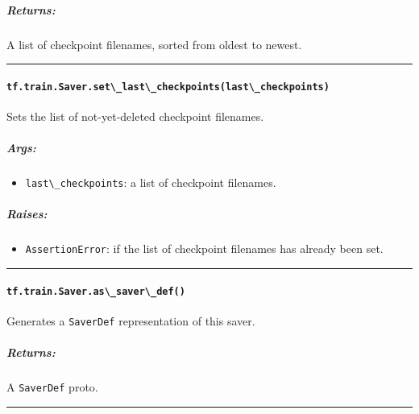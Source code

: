 \subparagraph{Returns: }\label{returns-15}

A list of checkpoint filenames, sorted from oldest to newest.

\begin{center}\rule{0.5\linewidth}{\linethickness}\end{center}

\paragraph{\texorpdfstring{\lstinline{tf.train.Saver.set\_last\_checkpoints(last\_checkpoints)}
}{tf.train.Saver.set\_last\_checkpoints(last\_checkpoints) }}\label{tf.train.saver.setux5flastux5fcheckpointslastux5fcheckpoints}

Sets the list of not-yet-deleted checkpoint filenames.

\subparagraph{Args: }\label{args-12}

\begin{itemize}
\tightlist
\item
  \lstinline{last\_checkpoints}: a list of checkpoint filenames.
\end{itemize}

\subparagraph{Raises: }\label{raises-4}

\begin{itemize}
\tightlist
\item
  \lstinline{AssertionError}: if the list of checkpoint filenames has
  already been set.
\end{itemize}

\begin{center}\rule{0.5\linewidth}{\linethickness}\end{center}

\paragraph{\texorpdfstring{\lstinline{tf.train.Saver.as\_saver\_def()}
}{tf.train.Saver.as\_saver\_def() }}\label{tf.train.saver.asux5fsaverux5fdef}

Generates a \lstinline{SaverDef} representation of this saver.

\subparagraph{Returns: }\label{returns-16}

A \lstinline{SaverDef} proto.

\begin{center}\rule{0.5\linewidth}{\linethickness}\end{center}

